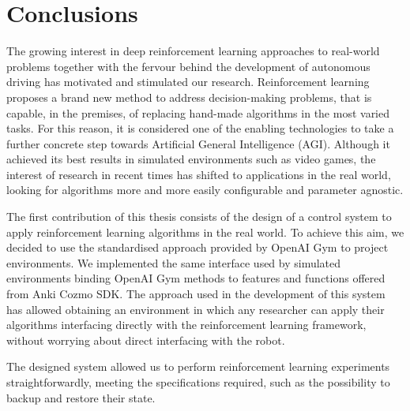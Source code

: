 \chapter{Conclusions} \label{ch:ch6}

The growing interest in deep reinforcement learning approaches to real-world problems together with the fervour behind the development of autonomous driving has motivated and stimulated our research.
Reinforcement learning proposes a brand new method to address decision-making problems, that is capable, in the premises, of replacing hand-made algorithms in the most varied tasks.
For this reason, it is considered one of the enabling technologies to take a further concrete step towards Artificial General Intelligence (AGI).
Although it achieved its best results in simulated environments such as video games, the interest of research in recent times has shifted to applications in the real world, looking for algorithms more and more easily configurable and parameter agnostic.

The first contribution of this thesis consists of the design of a control system to apply reinforcement learning algorithms in the real world.
To achieve this aim, we decided to use the standardised approach provided by OpenAI Gym to project environments.
We implemented the same interface used by simulated environments binding OpenAI Gym methods to features and functions offered from Anki Cozmo SDK.
The approach used in the development of this system has allowed obtaining an environment in which any researcher can apply their algorithms interfacing directly with the reinforcement learning framework, without worrying about direct interfacing with the robot.

The designed system allowed us to perform reinforcement learning experiments straightforwardly, meeting the specifications required, such as the possibility to backup and restore their state.

